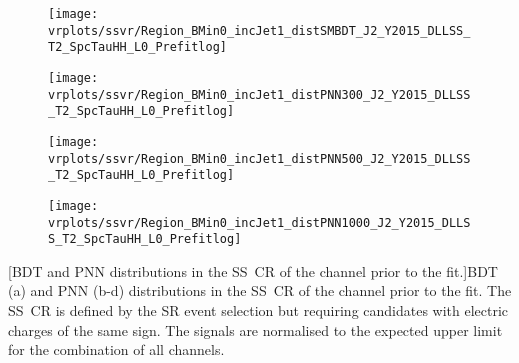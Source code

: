 {
  \centering

  \vspace*{1em}


  \begin{subfigure}{0.495\textwidth}
    \centering

    \texttt{[image: vrplots/ssvr/Region\_BMin0\_incJet1\_distSMBDT\_J2\_Y2015\_DLLSS\_T2\_SpcTauHH\_L0\_Prefitlog]}
    \subcaption{}
  \end{subfigure}\hfill%
  \begin{subfigure}{0.495\textwidth}
    \centering

    \texttt{[image: vrplots/ssvr/Region\_BMin0\_incJet1\_distPNN300\_J2\_Y2015\_DLLSS\_T2\_SpcTauHH\_L0\_Prefitlog]}
    \subcaption{}
  \end{subfigure}

  \begin{subfigure}{0.495\textwidth}
    \centering

    \texttt{[image: vrplots/ssvr/Region\_BMin0\_incJet1\_distPNN500\_J2\_Y2015\_DLLSS\_T2\_SpcTauHH\_L0\_Prefitlog]}
    \subcaption{}
  \end{subfigure}\hfill%
  \begin{subfigure}{0.495\textwidth}
    \centering

    \texttt{[image: vrplots/ssvr/Region\_BMin0\_incJet1\_distPNN1000\_J2\_Y2015\_DLLSS\_T2\_SpcTauHH\_L0\_Prefitlog]}
    \subcaption{}
  \end{subfigure}

  [BDT and PNN distributions in the SS~CR of the \hadhad
  channel prior to the fit.]{BDT (a) and PNN (b-d) distributions in the SS~CR of
    the \hadhad channel prior to the fit. The SS~CR is defined by the SR event
    selection but requiring \tauhadvis candidates with electric charges of the
    same sign. The signals are normalised to the expected upper limit for the
    combination of all channels.}
}


